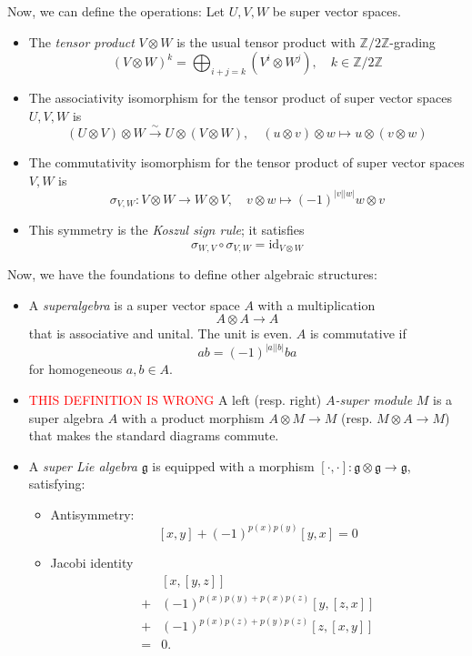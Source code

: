 Now, we can define the operations: Let $U, V, W$ be super vector spaces.
\begin{itemize}
    \item The \emph{tensor product} $V \otimes W$ is the usual tensor product with \(\mathbb{Z}/2\mathbb{Z}\)-grading
    \begin{equation*}
        (V \otimes W)^k = \bigoplus_{i + j = k} (V^i \otimes W^j), \quad k \in \mathbb{Z}/2\mathbb{Z}
    \end{equation*}
    \item The associativity isomorphism for the tensor product of super vector spaces $U, V, W$ is
    \begin{equation*}
        (U \otimes V) \otimes W \xrightarrow{\sim} U \otimes (V \otimes W), \quad (u \otimes v) \otimes w \mapsto u \otimes (v \otimes w)
    \end{equation*}
        \item The commutativity isomorphism for the tensor product of super vector spaces $V, W$ is
    \begin{equation*}
        \sigma_{V, W} : V \otimes W \to W \otimes V, \quad v \otimes w \mapsto (-1)^{|v||w|} w \otimes v 
    \end{equation*}
    \item This symmetry is the \emph{Koszul sign rule}; it satisfies 
    \[\sigma_{W, V} \circ \sigma_{V, W} = \mathrm{id}_{V \otimes W} \]
    \end{itemize}

Now, we have the foundations to define other algebraic structures:
\begin{itemize}
\item A \emph{superalgebra} is a super vector space $A$ with a multiplication
\[
    A \otimes A \to A
\]
that is associative and unital. The unit is even. $A$ is commutative if
\[
    ab = (-1)^{|a||b|} ba
\]
for homogeneous $a, b \in A$.

\item \textcolor{red}{THIS DEFINITION IS WRONG} A left (resp. right) \textit{$A$-super module} $M$ is a super algebra $A$ with a product morphism $A\otimes M\to M$ (resp. $M\otimes A\to M$) that makes the standard diagrams commute.
\item A \textit{super Lie algebra} $\mathfrak{g}$ is equipped with a morphism $[\cdot,\cdot]: \mathfrak{g}\otimes \mathfrak{g}\to \mathfrak{g}$, satisfying:
\begin{itemize}
    \item Antisymmetry:
    \[[x, y] + (-1)^{p(x)p(y)} [y, x] = 0\]
\item Jacobi identity
\begin{align*}
&[x, [y, z]]  \\ 
+& (-1)^{p(x)p(y)+p(x)p(z)} [y, [z, x]]  \\ 
+& (-1)^{p(x)p(z)+p(y)p(z)} [z, [x, y]]  \\ 
=& 0.
\end{align*}
\end{itemize}
\end{itemize}

